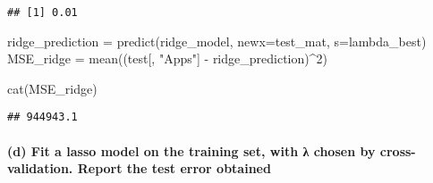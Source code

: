 \documentclass[
]{article}
\newenvironment{Shaded}{\begin{snugshade}}{\end{snugshade}}
\newcommand{\AttributeTok}[1]{\textcolor[rgb]{0.77,0.63,0.00}{#1}}
\newcommand{\DecValTok}[1]{\textcolor[rgb]{0.00,0.00,0.81}{#1}}
\newcommand{\FunctionTok}[1]{\textcolor[rgb]{0.00,0.00,0.00}{#1}}
\newcommand{\NormalTok}[1]{#1}
\newcommand{\OtherTok}[1]{\textcolor[rgb]{0.56,0.35,0.01}{#1}}
\newcommand{\SpecialCharTok}[1]{\textcolor[rgb]{0.00,0.00,0.00}{#1}}
\newcommand{\StringTok}[1]{\textcolor[rgb]{0.31,0.60,0.02}{#1}}
\begin{document}
\begin{Shaded}
\end{Shaded}

\begin{verbatim}
## [1] 0.01
\end{verbatim}

\begin{Shaded}
\begin{Highlighting}[]
\NormalTok{ridge\_prediction }\OtherTok{=} \FunctionTok{predict}\NormalTok{(ridge\_model, }\AttributeTok{newx=}\NormalTok{test\_mat, }\AttributeTok{s=}\NormalTok{lambda\_best)}
\NormalTok{MSE\_ridge }\OtherTok{=} \FunctionTok{mean}\NormalTok{((test[, }\StringTok{"Apps"}\NormalTok{] }\SpecialCharTok{{-}}\NormalTok{ ridge\_prediction)}\SpecialCharTok{\^{}}\DecValTok{2}\NormalTok{)}

\FunctionTok{cat}\NormalTok{(MSE\_ridge)}
\end{Highlighting}
\end{Shaded}

\begin{verbatim}
## 944943.1
\end{verbatim}

\hypertarget{d-fit-a-lasso-model-on-the-training-set-with-ux3bb-chosen-by-cross-validation.-report-the-test-error-obtained}{%
\paragraph{(d) Fit a lasso model on the training set, with λ chosen by
cross-validation. Report the test error
obtained}\label{d-fit-a-lasso-model-on-the-training-set-with-ux3bb-chosen-by-cross-validation.-report-the-test-error-obtained}}
\end{document}

